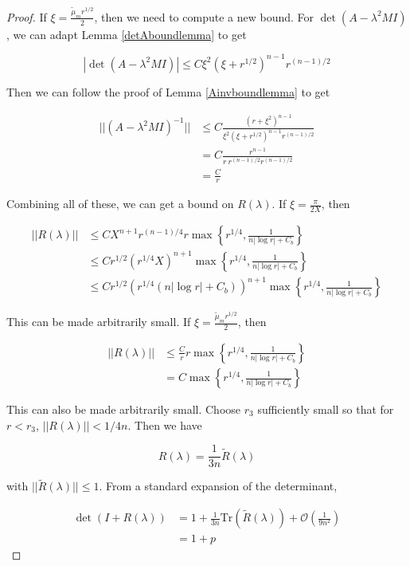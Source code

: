 \documentclass[thesis.tex]{subfiles}
\begin{document}
\begin{lemma}
\begin{proof}
If $\xi = \frac{\tilde{\mu}_m r^{1/2}}{2}$, then we need to compute a new bound. For $\det(A - \lambda^2 MI)$, we can adapt Lemma \ref{detAboundlemma} to get

\[
|\det(A - \lambda^2 MI)| \leq C \xi^2 (\xi + r^{1/2})^{n-1} r^{(n-1)/2}
\]

Then we can follow the proof of Lemma \ref{Ainvboundlemma} to get

\begin{align*}
||(A - \lambda^2 MI)^{-1}|| &\leq C \frac{(r + \xi^2)^{n-1}}{\xi^2 (\xi + r^{1/2})^{n-1} r^{(n-1)/2}} \\
&= C \frac{r^{n-1}}{r \: r^{(n-1)/2} r^{(n-1)/2}} \\
&= \frac{C}{r} 
\end{align*}

Combining all of these, we can get a bound on $R(\lambda)$. If $\xi = \frac{\pi}{2X}$, then

\begin{align*}
||R(\lambda)|| &\leq C X^{n+1} r^{(n-1)/4} r \max\left\{ r^{1/4}, \frac{1}{n|\log r| + C_b } \right\} \\
&\leq C r^{1/2} (r^{1/4} X)^{n+1} \max\left\{ r^{1/4}, \frac{1}{n|\log r| + C_b } \right\} \\
&\leq C r^{1/2} \left(r^{1/4}(n|\log r| + C_b)\right)^{n+1} \max\left\{ r^{1/4}, \frac{1}{n|\log r| + C_b } \right\}
\end{align*}

This can be made arbitrarily small. If $\xi = \frac{\tilde{\mu}_m r^{1/2}}{2}$, then 

\begin{align*}
||R(\lambda)|| &\leq \frac{C}{r} r \max\left\{ r^{1/4}, \frac{1}{n|\log r| + C_b} \right\} \\
&= C \max\left\{ r^{1/4}, \frac{1}{n|\log r| + C_b} \right\} 
\end{align*}

This can also be made arbitrarily small. Choose $r_3$ sufficiently small so that for $r < r_3$, $||R(\lambda)|| < 1/4n$. Then we have

\[
R(\lambda) = \frac{1}{3n}\tilde{R}(\lambda)
\] 

with $||\tilde{R}(\lambda)|| \leq 1$. From a standard expansion of the determinant, 

\begin{align*}
\det(I + R(\lambda)) &= 1 + \frac{1}{3n} \text{Tr}(\tilde{R}(\lambda)) + \mathcal{O}\left(\frac{1}{9n^2} \right) \\
&= 1 + p
\end{align*}


\end{proof}
\end{lemma}
\end{document}
